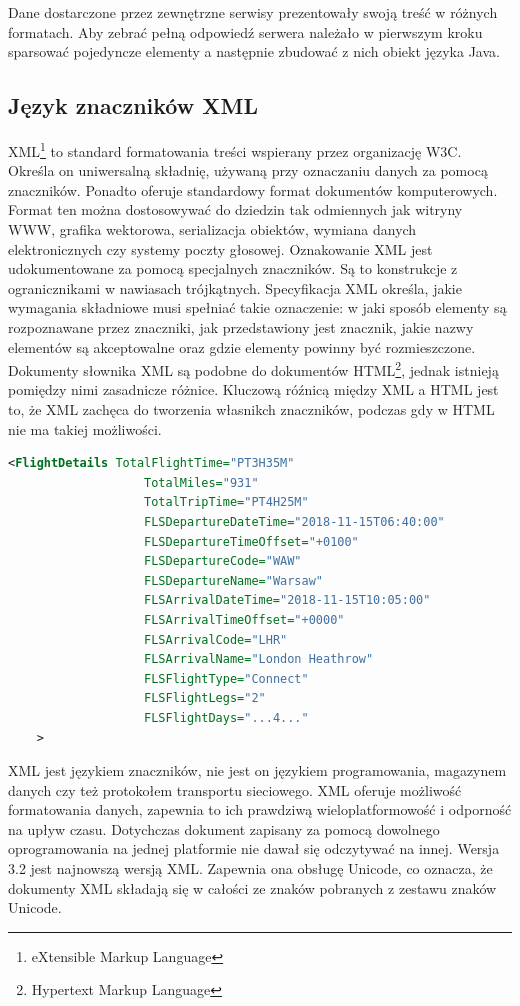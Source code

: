 \documentclass[12pt, twoside]{report}
\begin{document}
Dane dostarczone przez zewnętrzne serwisy prezentowały swoją treść w różnych formatach. Aby zebrać pełną odpowiedź serwera należało w pierwszym kroku sparsować pojedyncze elementy a następnie zbudować z nich obiekt języka Java.
\subsection{Język znaczników XML}
XML\footnote{eXtensible Markup Language} to standard formatowania treści wspierany przez organizację W3C. Określa on uniwersalną składnię, używaną przy oznaczaniu danych za pomocą znaczników. Ponadto oferuje standardowy format dokumentów komputerowych. Format ten można dostosowywać do dziedzin tak odmiennych jak witryny WWW, grafika wektorowa, serializacja obiektów, wymiana danych elektronicznych czy systemy poczty głosowej. Oznakowanie XML jest udokumentowane za pomocą specjalnych znaczników. Są to konstrukcje z ogranicznikami w nawiasach trójkątnych. Specyfikacja XML określa, jakie wymagania składniowe musi spełniać takie oznaczenie: w jaki sposób elementy są rozpoznawane przez znaczniki, jak przedstawiony jest znacznik, jakie nazwy elementów są akceptowalne oraz gdzie elementy powinny być rozmieszczone. Dokumenty słownika XML są podobne do dokumentów HTML\footnote{Hypertext Markup Language}, jednak istnieją pomiędzy nimi zasadnicze różnice. Kluczową róźnicą między XML a HTML jest to, że XML zachęca do tworzenia własnikch znaczników, podczas gdy w HTML nie ma takiej możliwości.\cite{xml}

\begin{lstlisting}[language=XML, caption=Fragment danych w formacie XML]
    <FlightDetails TotalFlightTime="PT3H35M"
                   TotalMiles="931"
                   TotalTripTime="PT4H25M"
                   FLSDepartureDateTime="2018-11-15T06:40:00"
                   FLSDepartureTimeOffset="+0100"
                   FLSDepartureCode="WAW"
                   FLSDepartureName="Warsaw"
                   FLSArrivalDateTime="2018-11-15T10:05:00"
                   FLSArrivalTimeOffset="+0000"
                   FLSArrivalCode="LHR"
                   FLSArrivalName="London Heathrow"
                   FLSFlightType="Connect"
                   FLSFlightLegs="2"
                   FLSFlightDays="...4..."
    >
\end{lstlisting}
\newpage
XML jest językiem znaczników, nie jest on językiem programowania, magazynem danych czy też protokołem transportu sieciowego. XML oferuje możliwość formatowania danych, zapewnia to ich prawdziwą wieloplatformowość i odporność na upływ czasu. Dotychczas dokument zapisany za pomocą dowolnego oprogramowania na jednej platformie nie dawał się odczytywać na innej. Wersja 3.2 jest najnowszą wersją XML. Zapewnia ona obsługę Unicode, co oznacza, że dokumenty XML składają się w całości ze znaków pobranych z zestawu znaków Unicode. 
\end{document}
